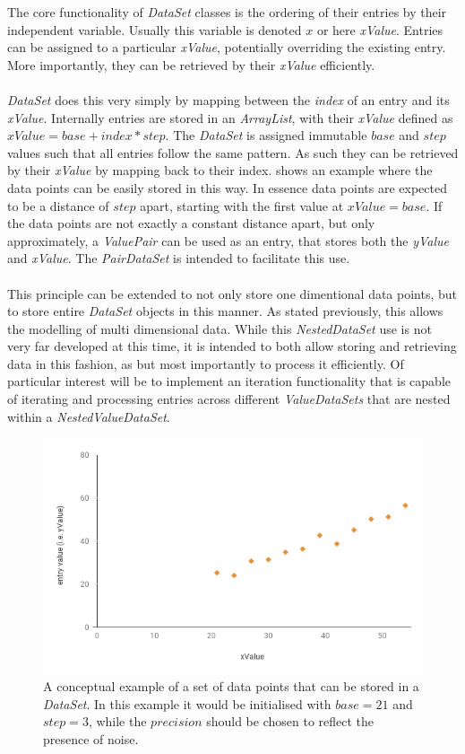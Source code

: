 \documentclass[main.tex]{subfiles}
\begin{document}
      The core functionality of \textit{DataSet} classes is the ordering of their entries by their independent variable. Usually this variable is denoted $x$ or here \textit{xValue}. Entries can be assigned to a particular \textit{xValue}, potentially overriding the existing entry. More importantly, they can be retrieved by their \textit{xValue} efficiently. 
      \\\\
      \textit{DataSet} does this very simply by mapping between the \textit{index} of an entry and its \textit{xValue}. Internally entries are stored in an \textit{ArrayList}, with their \textit{xValue} defined as $xValue= base + index * step$. The \textit{DataSet} is assigned immutable $base$ and $step$ values such that all entries follow the same pattern. As such they can be retrieved by their \textit{xValue} by mapping back to their index.  shows an example where the data points can be easily stored in this way. In essence data points are expected to be a distance of $step$ apart, starting with the first value at $xValue=base$. If the data points are not exactly a constant distance apart, but only approximately, a \textit{ValuePair} can be used as an entry, that stores both the \textit{yValue} and \textit{xValue}. The \textit{PairDataSet} is intended to facilitate this use.
      \\\\
      This principle can be extended to not only store one dimentional data points, but to store entire \textit{DataSet} objects in this manner. As stated previously, this allows the modelling of multi dimensional data. While this \textit{NestedDataSet} use is not very far developed at this time, it is intended to both allow storing and retrieving data in this fashion, as but most importantly to process it efficiently. Of particular interest will be to implement an iteration functionality that is capable of iterating and processing entries across different \textit{ValueDataSets} that are nested within a \textit{NestedValueDataSet}.
      
      \begin{figure}[h]
        \centering
        \includegraphics[width=0.75\linewidth]{figures/dataSetGraph}
        \caption{A conceptual example of a set of data points that can be stored in a \textit{DataSet}. In this example it would be initialised with $base=21$ and $step=3$, while the $precision$ should be chosen to reflect the presence of noise.}
        \label{fig:dataSetGraph}
      \end{figure}
      
\end{document}
